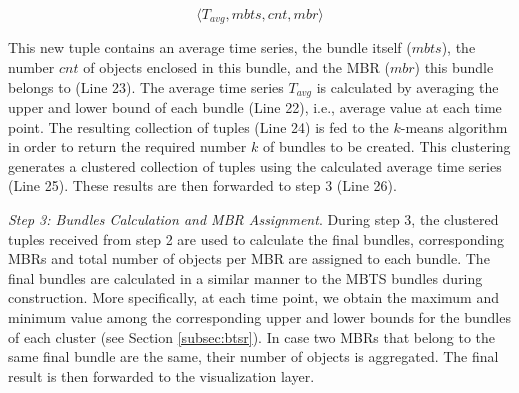 \begin{equation*}
\langle T_{avg}, mbts, cnt, mbr \rangle
\end{equation*}

\noindent This new tuple contains an average time series, the bundle itself ($mbts$), the number $cnt$ of objects enclosed in this bundle, and the MBR ($mbr$) this bundle belongs to (Line 23). The average time series $T_{avg}$ is calculated by averaging the upper and lower bound of each bundle (Line 22), i.e., average value at each time point. The resulting collection of tuples (Line 24) is fed to the $k$-means algorithm in order to return the required number $k$ of bundles to be created. This clustering generates a clustered collection of tuples using the calculated average time series (Line 25). These results are then forwarded to step 3 (Line 26).



\emph{Step 3: Bundles Calculation and MBR Assignment}.
During step 3, the clustered tuples received from step 2 are used to calculate the final bundles, corresponding MBRs and total number of objects per MBR are assigned to each bundle. The final bundles are calculated in a similar manner to the MBTS bundles during \btsr construction. More specifically, at each time point, we obtain the maximum and minimum value among the corresponding upper and lower bounds for the bundles of each cluster (see Section \ref{subsec:btsr}). In case two MBRs that belong to the same final bundle are the same, their number of objects is aggregated. The final result is then forwarded to the visualization layer.


